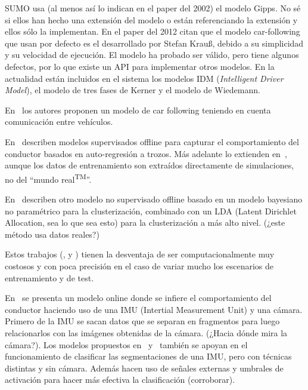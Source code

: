 SUMO usa (al menos así lo indican en el paper del 2002) el modelo Gipps\cite{krajzewicz2002sumo}. No sé si ellos han hecho una extensión del modelo o están referenciando la extensión y ellos sólo la implementan. En el paper del 2012 citan que el modelo car-following que usan por defecto es el desarrollado por Stefan Krauß\cite{jin2016evaluation}, debido a su simplicidad y su velocidad de ejecución. El modelo ha probado ser válido, pero tiene algunos defectos, por lo que existe un API para implementar otros modelos. En la actualidad están incluidos en el sistema los modelos IDM\cite{treiber2000congested} (\textit{Intelligent Driver Model}), el modelo de tres fases de Kerner\cite{kerner2008testbed} y el modelo de Wiedemann\cite{wiedemann1974simulation}.

En~\cite{tang2014new} los autores proponen un modelo de car following teniendo en cuenta comunicación entre vehículos.

En~\cite{sekizawa2007modeling} describen modelos supervisados offline para capturar el comportamiento del conductor basados en auto-regresión a trozos. Más adelante lo extienden en~\cite{terada2010multi}, aunque los datos de entrenamiento son extraídos directamente de simulaciones, no del \enquote{mundo real\textsuperscript{TM}}.

En~\cite{bando2013unsupervised} describen otro modelo no supervisado offline basado en un modelo bayesiano no paramétrico para la clusterización, combinado con un LDA (Latent Dirichlet Allocation, sea lo que sea esto) para la clusterización a más alto nivel. (\TODO ¿este método usa datos reales?)

Estos trabajos (\cite{sekizawa2007modeling}, \cite{terada2010multi} y \cite{bando2013unsupervised}) tienen la desventaja de ser computacionalmente muy costosos y con poca precisión en el caso de variar mucho los escenarios de entrenamiento y de test.

En~\cite{maye2011bayesian} se presenta un modelo online donde se infiere el comportamiento del conductor haciendo uso de una IMU (Intertial Measurement Unit) y una cámara. Primero de la IMU se sacan datos que se separan en fragmentos para luego relacionarlos con las imágenes obtenidas de la cámara. (\TODO ¿Hacia dónde mira la cámara?). Los modelos propuestos en~\cite{johnson2011driving} y~\cite{van2013driver} también se apoyan en el funcionamiento de clasificar las segmentaciones de una IMU, pero con técnicas distintas y sin cámara. Además hacen uso de señales externas y umbrales de activación para hacer más efectiva la clasificación (\TODO corroborar).

